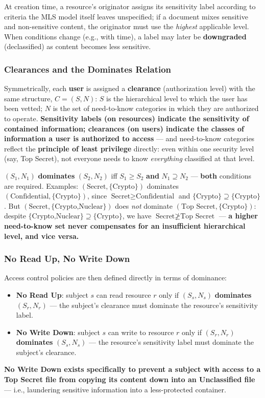 \documentclass[12pt, a4paper]{article}
\begin{document}
At creation time, a resource's originator assigns its sensitivity label according to criteria the MLS model itself leaves unspecified; if a document mixes sensitive and non-sensitive content, the originator must use the \emph{highest} applicable level. When conditions change (e.g., with time), a label may later be \textbf{downgraded} (declassified) as content becomes less sensitive.

\subsubsection{Clearances and the Dominates Relation}
Symmetrically, each \textbf{user} is assigned a \textbf{clearance} (authorization level) with the same structure, $C=(S,N)$: $S$ is the hierarchical level to which the user has been vetted; $N$ is the set of need-to-know categories in which they are authorized to operate. \textcolor{blue!50!black}{\textbf{Sensitivity labels (on resources) indicate the sensitivity of contained information; clearances (on users) indicate the classes of information a user is authorized to access}} --- and need-to-know categories reflect the \textbf{principle of least privilege} directly: even within one security level (say, Top Secret), not everyone needs to know \emph{everything} classified at that level.

$(S_1,N_1)$ \textbf{dominates} $(S_2,N_2)$ iff $S_1 \geq S_2$ \textbf{and} $N_1 \supseteq N_2$ --- \textbf{both} conditions are required. Examples: $(\text{Secret},\{\text{Crypto}\})$ dominates $(\text{Confidential},\{\text{Crypto}\})$, since $\text{Secret}\geq\text{Confidential}$ and $\{\text{Crypto}\}\supseteq\{\text{Crypto}\}$. But $(\text{Secret},\{\text{Crypto,Nuclear}\})$ does \emph{not} dominate $(\text{Top Secret},\{\text{Crypto}\})$: despite $\{\text{Crypto,Nuclear}\}\supseteq\{\text{Crypto}\}$, we have $\text{Secret} \not\geq \text{Top Secret}$ --- \textcolor{red!70!black}{\textbf{a higher need-to-know set never compensates for an insufficient hierarchical level, and vice versa.}}

\subsubsection{No Read Up, No Write Down}
Access control policies are then defined directly in terms of dominance:
\begin{itemize}
    \item \textbf{No Read Up}: subject $s$ can read resource $r$ only if $(S_s,N_s)$ \textbf{dominates} $(S_r,N_r)$ --- the subject's clearance must dominate the resource's sensitivity label.
    \item \textbf{No Write Down}: subject $s$ can write to resource $r$ only if $(S_r,N_r)$ \textbf{dominates} $(S_s,N_s)$ --- the resource's sensitivity label must dominate the subject's clearance.
\end{itemize}
\textcolor{red!70!black}{\textbf{No Write Down exists specifically to prevent a subject with access to a Top Secret file from copying its content down into an Unclassified file}} --- i.e., laundering sensitive information into a less-protected container.
\end{document}
